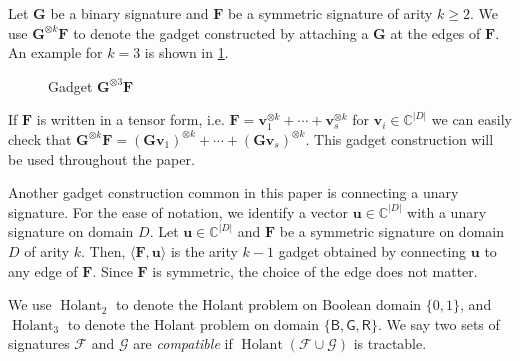 \documentclass[11pt]{article}
\DeclareMathOperator{\hol}{Holant}
\newcommand{\db}{\mathsf{B}}
\newcommand{\dg}{\mathsf{G}}
\newcommand{\dr}{\mathsf{R}}
\begin{document}
Let $\mathbf{G}$ be a binary signature and $\mathbf{F}$ be a symmetric signature of arity $k \ge 2$.
We use $\mathbf{G}^{\otimes k} \mathbf{F}$ to denote the gadget constructed by attaching a $\mathbf{G}$ at the edges of $\mathbf{F}$.
An example for $k = 3$ is shown in \cref{fig:gf}.
\begin{figure}
\centering
  \caption{Gadget $\mathbf{G}^{\otimes 3} \mathbf{F}$}\label{fig:gf}
\end{figure}
If $\mathbf{F}$ is written in a tensor form, i.e. $\mathbf{F} = \mathbf{v}_1^{\otimes k} + \cdots + \mathbf{v}_s^{\otimes k}$ for $\mathbf{v}_i \in \mathbb{C}^{\lvert D \rvert}$
we can easily check that $\mathbf{G}^{\otimes k} \mathbf{F} = (\mathbf{G} \mathbf{v}_1)^{\otimes k} + \cdots + (\mathbf{G} \mathbf{v}_s)^{\otimes k}$.
This gadget construction will be used throughout the paper.

Another gadget construction common in this paper is connecting a unary signature.
For the ease of notation, we identify a vector $\mathbf{u} \in \mathbb{C}^{\lvert D \rvert}$ with a unary signature on domain $D$.
Let $\mathbf{u} \in \mathbb{C}^{\lvert D \rvert}$ and $\mathbf{F}$ be a symmetric signature on domain $D$ of arity $k$.
Then, $\langle \mathbf{F}, \mathbf{u} \rangle$ is the arity $k - 1$ gadget obtained by connecting $\mathbf{u}$ to any edge of $\mathbf{F}$.
Since $\mathbf{F}$ is symmetric, the choice of the edge does not matter.

We use $\hol_2$ to denote the Holant problem on Boolean domain $\{0, 1\}$, and $\hol_3$ to denote the Holant problem on domain $\{\db, \dg, \dr\}$.
We say two sets of signatures $\mathcal{F}$ and $\mathcal{G}$ are \textit{compatible} if $\hol(\mathcal{F} \cup \mathcal{G})$ is tractable.
\end{document}
